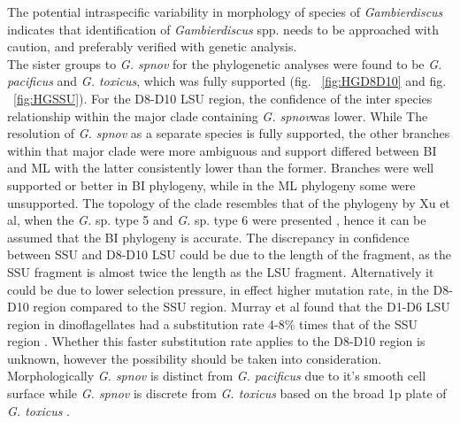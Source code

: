 \documentclass[12pt]{article}
\begin{document}
The potential intraspecific variability in morphology of species of \textit{Gambierdiscus} indicates that identification of \emph{Gambierdiscus} spp. needs to be approached with caution, and preferably verified with genetic analysis.\\
The sister groups to \emph{G. spnov} for the phylogenetic analyses were found to be \emph{G. pacificus} and \emph{G. toxicus}, which was fully supported (fig. ~\ref{fig:HGD8D10} and fig. ~\ref{fig:HGSSU}). For the D8-D10 LSU region, the confidence of the inter species relationship within the major clade containing \emph{G. spnov}was lower.  While The resolution of \emph{G. spnov} as a separate species is fully supported, the other branches within that major clade were more ambiguous and support differed between BI and ML with the latter consistently lower than the former. Branches were well supported or better in BI phylogeny, while in the ML phylogeny some were unsupported. The topology of the clade resembles that of the phylogeny by Xu et al, when the \emph{G.} sp. type 5 and \emph{G.} sp. type 6 were presented \citep{xu2014distribution}, hence it can be assumed that the BI phylogeny is accurate.
The discrepancy in confidence between SSU and D8-D10 LSU could be due to the length of the fragment, as the SSU fragment is almost twice the length as the LSU fragment. Alternatively it could be due to lower selection pressure, in effect higher mutation rate, in the D8-D10 region compared to the SSU region. Murray et al found that the D1-D6 LSU region in dinoflagellates had a substitution rate 4-8\% times that of the SSU region \citep{murray2005improving}. Whether this faster substitution rate applies to the D8-D10 region is unknown, however the possibility should be taken into consideration. \\
Morphologically \emph{G. spnov} is distinct from \emph{G. pacificus} due to it's smooth cell surface \citep{chinain1999morphology} while \emph{G. spnov} is discrete from \emph{G. toxicus} based on the broad 1p plate of \emph{G. toxicus} \citep{litaker2009taxonomy}.\\
\end{document}
